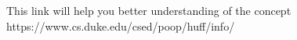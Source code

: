\documentclass[]{article}
\title{}
\author{sai kiran}
\begin{document}
\maketitle
This link will help you better understanding of the concept \\

https://www.cs.duke.edu/csed/poop/huff/info/
\end{document}

